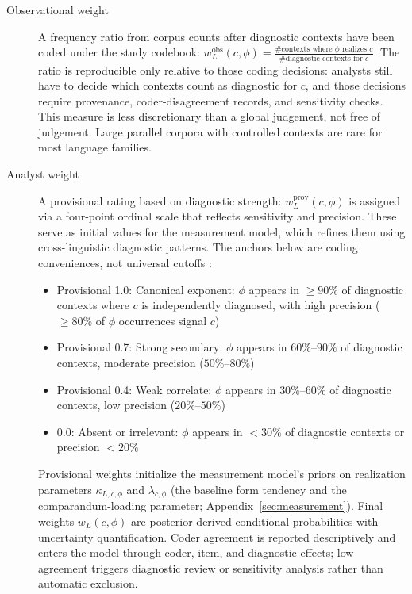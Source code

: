 \documentclass[12pt]{article}
\begin{document}
\begin{description}
  \item[Observational weight] A frequency ratio from corpus counts after diagnostic contexts have been coded under the study codebook: $w_L^{\text{obs}}(c,\phi) = \frac{\text{\# contexts where } \phi \text{ realizes } c}{\text{\# diagnostic contexts for } c}$. The ratio is reproducible only relative to those coding decisions: analysts still have to decide which contexts count as diagnostic for $c$, and those decisions require provenance, coder-disagreement records, and sensitivity checks. This measure is less discretionary than a global judgement, not free of judgement. Large parallel corpora with controlled contexts are rare for most language families.
  
  \item[Analyst weight] A provisional rating based on diagnostic strength: $w_L^{\text{prov}}(c,\phi)$ is assigned via a four-point ordinal scale that reflects sensitivity and precision. These serve as initial values for the measurement model, which refines them using cross-linguistic diagnostic patterns. The anchors below are coding conveniences, not universal cutoffs \parencite{Cowart1997,schutze2016}:
  \begin{itemize}
    \item Provisional 1.0: Canonical exponent: $\phi$ appears in $\geq 90\%$ of diagnostic contexts where $c$ is independently diagnosed, with high precision ($\geq 80\%$ of $\phi$ occurrences signal $c$)
    \item Provisional 0.7: Strong secondary: $\phi$ appears in $60\%$--$90\%$ of diagnostic contexts, moderate precision ($50\%$--$80\%$)
    \item Provisional 0.4: Weak correlate: $\phi$ appears in $30\%$--$60\%$ of diagnostic contexts, low precision ($20\%$--$50\%$)
    \item 0.0: Absent or irrelevant: $\phi$ appears in $<30\%$ of diagnostic contexts or precision $<20\%$
  \end{itemize}

Provisional weights initialize the measurement model's priors on realization parameters $\kappa_{L,c,\phi}$ and $\lambda_{c,\phi}$ (the baseline form tendency and the comparandum-loading parameter; Appendix~\ref{sec:measurement}). Final weights $w_L(c,\phi)$ are posterior-derived conditional probabilities with uncertainty quantification. Coder agreement is reported descriptively and enters the model through coder, item, and diagnostic effects; low agreement triggers diagnostic review or sensitivity analysis rather than automatic exclusion.
\end{description}
\end{document}
